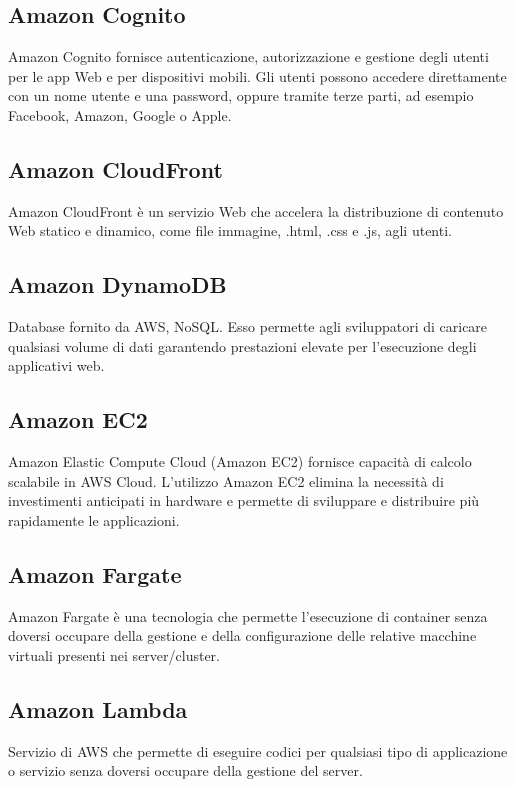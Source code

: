 \documentclass{classes/base}
\begin{document}
        \subsection*{Amazon Cognito}
        Amazon Cognito fornisce autenticazione, autorizzazione e gestione degli utenti per le app Web e per dispositivi mobili. Gli utenti possono accedere direttamente con un nome utente e una password, oppure tramite terze parti, ad esempio Facebook, Amazon, Google o Apple.
        
        \subsection*{Amazon CloudFront}
        Amazon CloudFront è un servizio Web che accelera la distribuzione di contenuto Web statico e dinamico, come file immagine, .html, .css e .js, agli utenti.

        \subsection*{Amazon DynamoDB}
        Database fornito da AWS, NoSQL. Esso permette agli sviluppatori di caricare qualsiasi volume di dati garantendo prestazioni elevate per l'esecuzione degli applicativi web.

        \subsection*{Amazon EC2}
        Amazon Elastic Compute Cloud (Amazon EC2) fornisce capacità di calcolo scalabile in AWS Cloud. L'utilizzo Amazon EC2 elimina la necessità di investimenti anticipati in hardware e permette di sviluppare e distribuire più rapidamente le applicazioni.

        \subsection*{Amazon Fargate}
        Amazon Fargate è una tecnologia che permette l'esecuzione di container senza doversi occupare della gestione e della configurazione delle relative macchine virtuali presenti nei server/cluster. 

        \subsection*{Amazon Lambda}
        Servizio di AWS che permette di eseguire codici per qualsiasi tipo di applicazione o servizio senza doversi occupare della gestione del server.
\end{document}
